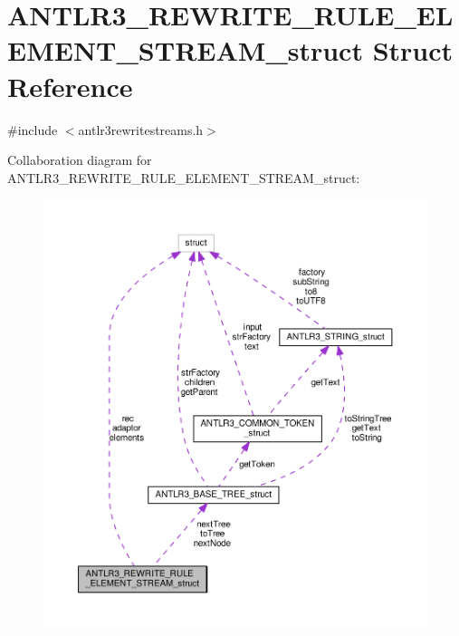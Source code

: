 \hypertarget{struct_a_n_t_l_r3___r_e_w_r_i_t_e___r_u_l_e___e_l_e_m_e_n_t___s_t_r_e_a_m__struct}{\section{A\-N\-T\-L\-R3\-\_\-\-R\-E\-W\-R\-I\-T\-E\-\_\-\-R\-U\-L\-E\-\_\-\-E\-L\-E\-M\-E\-N\-T\-\_\-\-S\-T\-R\-E\-A\-M\-\_\-struct Struct Reference}
\label{struct_a_n_t_l_r3___r_e_w_r_i_t_e___r_u_l_e___e_l_e_m_e_n_t___s_t_r_e_a_m__struct}
}


{\ttfamily \#include $<$antlr3rewritestreams.\-h$>$}



Collaboration diagram for A\-N\-T\-L\-R3\-\_\-\-R\-E\-W\-R\-I\-T\-E\-\_\-\-R\-U\-L\-E\-\_\-\-E\-L\-E\-M\-E\-N\-T\-\_\-\-S\-T\-R\-E\-A\-M\-\_\-struct\-:
\nopagebreak
\begin{figure}[H]
\begin{center}
\leavevmode
\includegraphics[width=350pt]{struct_a_n_t_l_r3___r_e_w_r_i_t_e___r_u_l_e___e_l_e_m_e_n_t___s_t_r_e_a_m__struct__coll__graph}
\end{center}
\end{figure}
